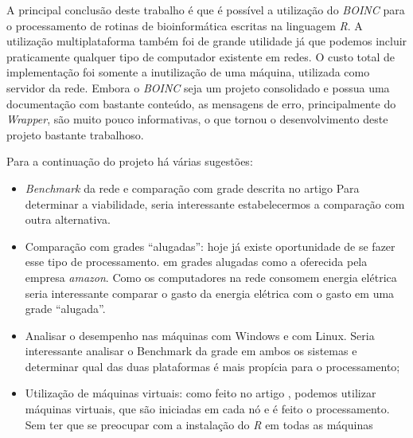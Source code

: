 
A principal conclusão deste trabalho é que é possível a utilização do \emph{BOINC} para o processamento
de rotinas de bioinformática escritas na linguagem \emph{R}. A utilização multiplataforma
também foi de grande utilidade já que podemos incluir praticamente qualquer tipo de computador 
existente em redes. O custo total de implementação foi somente a inutilização de uma máquina, utilizada
como servidor da rede. Embora o \emph{BOINC} seja um projeto consolidado e possua uma documentação com bastante conteúdo,
as mensagens de erro, principalmente do \emph{Wrapper}, são muito pouco informativas, o que tornou o desenvolvimento 
deste projeto bastante trabalhoso.

Para a continuação do projeto há várias sugestões:

\begin{itemize}
  \item \emph{Benchmark} da rede e comparação com grade descrita no artigo \cite{Dias}
Para determinar a viabilidade, seria interessante estabelecermos a comparação com outra 
alternativa. 
  \item Comparação com grades ``alugadas'': hoje já existe oportunidade de se fazer esse tipo de processamento.
em grades alugadas como a oferecida pela empresa \emph{amazon}. Como os computadores na rede 
consomem energia elétrica seria interessante comparar o gasto da energia elétrica com o gasto em 
uma grade ``alugada''.
  \item Analisar o desempenho nas máquinas com Windows e com Linux. Seria interessante analisar 
o Benchmark da grade em ambos os sistemas e determinar qual das duas plataformas é mais
propícia para o processamento;
  \item Utilização de máquinas virtuais: como feito no artigo \cite{boinc}, podemos utilizar
máquinas virtuais, que são iniciadas em cada nó e é feito o processamento. Sem ter que se preocupar
com a instalação do \emph{R} em todas as máquinas 
\end{itemize}


